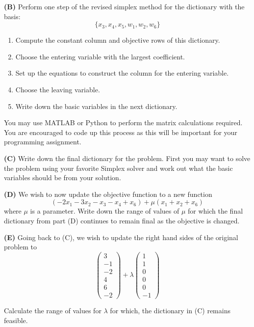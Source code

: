 \documentclass[11pt]{article}
\begin{document}
\noindent\textbf{(B)} Perform one step of the revised simplex method for the dictionary with the basis:
\[ \{x_3, x_4, x_5, w_1, w_2, w_6 \} \]

\begin{enumerate}
\item Compute the constant column and objective rows of this dictionary.
\item Choose the entering variable with the largest coefficient.
\item Set up the equations to construct the column for the entering
  variable.
\item Choose the leaving variable.
\item Write down the basic variables in the next dictionary.
\end{enumerate}

You may use MATLAB or Python to perform the matrix calculations
required. You are encouraged to code up this process as this will be
important for your programming assignment.


\noindent\textbf{(C)} Write down the final dictionary for the
problem. First you may want to solve the problem using your favorite
Simplex solver and work out what the basic variables should be from
your solution.


\noindent\textbf{(D)} We wish to now update the objective function to
a new function 
\[  (-2 x_1  - 3 x_2  - x_3  - x_4 + x_6 )  + \mu ( x_1 + x_2 +
  x_6) \]
where $\mu$ is a parameter. Write down the range of values of $\mu$
for which the final dictionary from part (D) continues to remain final
as the objective is changed.

\noindent\textbf{(E)} Going back to (C), we wish to update the right
hand sides of the original problem to 
\[ \left( \begin{array}{l} 3 \\ -1 \\ -2 \\ 4 \\ 6 \\ -2 \end{array}
  \right) + \lambda \left( \begin{array}{l}
1 \\ 1\\ 0 \\ 0\\ 0 \\ -1 \end{array} \right) \]

Calculate the range of values for $\lambda$ for which, the dictionary
in (C) remains feasible.
\end{document}
